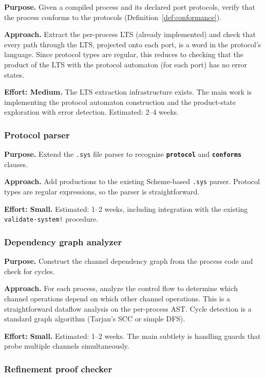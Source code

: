 \documentclass[11pt]{article}
\newcommand{\keyword}[1]{\texttt{\textbf{#1}}}
\begin{document}
\textbf{Purpose.} Given a compiled process and its declared port
protocols, verify that the process conforms to the protocols
(Definition~\ref{def:conformance}).

\textbf{Approach.} Extract the per-process LTS (already implemented)
and check that every path through the LTS, projected onto each port,
is a word in the protocol's language.  Since protocol types are
regular, this reduces to checking that the product of the LTS with
the protocol automaton (for each port) has no error states.

\textbf{Effort: Medium.}  The LTS extraction infrastructure exists.
The main work is implementing the protocol automaton construction and
the product-state exploration with error detection.  Estimated: 2--4
weeks.

\subsubsection{Protocol parser}

\textbf{Purpose.} Extend the \texttt{.sys} file parser to recognize
\keyword{protocol} and \keyword{conforms} clauses.

\textbf{Approach.}  Add productions to the existing Scheme-based
\texttt{.sys} parser.  Protocol types are regular expressions, so the
parser is straightforward.

\textbf{Effort: Small.}  Estimated: 1--2 weeks, including integration
with the existing \texttt{validate-system!} procedure.

\subsubsection{Dependency graph analyzer}

\textbf{Purpose.} Construct the channel dependency graph from the
process code and check for cycles.

\textbf{Approach.} For each process, analyze the control flow to
determine which channel operations depend on which other channel
operations.  This is a straightforward dataflow analysis on the
per-process AST.  Cycle detection is a standard graph algorithm
(Tarjan's SCC or simple DFS).

\textbf{Effort: Small.}  Estimated: 1--2 weeks.  The main subtlety is
handling guards that probe multiple channels simultaneously.

\subsubsection{Refinement proof checker}
\end{document}
